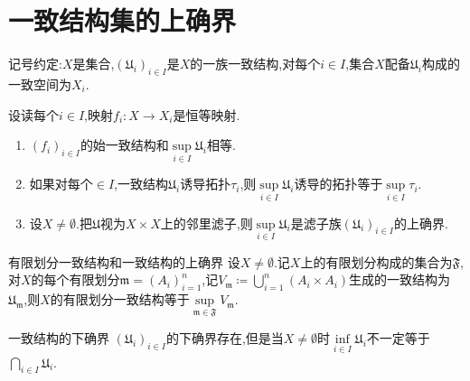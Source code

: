 \section{一致结构集的上确界}

记号约定:$X$是集合,$\left(\mathfrak{U}_{i}\right)_{i\in I}$是$X$的一族一致结构,对每个$i\in I$,集合$X$配备$\mathfrak{U}_{i}$构成的一致空间为$X_{i}$.

\begin{proposition}{}{}
	设读每个$i\in I$,映射$f_{i}:X\to X_{i}$是恒等映射.
	\begin{enumerate}
		\item $\left(f_{i}\right)_{i\in I}$的始一致结构和$\sup\limits_{i\in I}\mathfrak{U}_{i}$相等.
		\item 如果对每个$\in I$,一致结构$\mathfrak{U}_{i}$诱导拓扑$\tau_{i}$,则$\sup\limits_{i\in I}\mathfrak{U}_{i}$诱导的拓扑等于$\sup\limits_{i\in I}\tau_{i}$.
		\item 设$X\neq\emptyset$.把$\mathfrak{U}$视为$X\times X$上的邻里滤子,则$\sup\limits_{i\in I}\mathfrak{U}_{i}$是滤子族$\left(\mathfrak{U}_{i}\right)_{i\in I}$的上确界.
	\end{enumerate}
\end{proposition}

\begin{example}{有限划分一致结构和一致结构的上确界}{}
	设$X\neq\emptyset$.记$X$上的有限划分构成的集合为$\mathfrak{F}$,对$X$的每个有限划分$\mathfrak{m}=\left(A_{i}\right)_{i=1}^{n}$,记$V_{\mathfrak{m}}\coloneq\bigcup\limits_{i=1}^{n}\left(A_{i}\times A_{i}\right)$生成的一致结构为$\mathfrak{U}_{\mathfrak{m}}$,则$X$的有限划分一致结构等于$\sup\limits_{\mathfrak{m}\in\mathfrak{F}}V_{\mathfrak{m}}$.
\end{example}

\begin{remark}{一致结构的下确界}{}
	$\left(\mathfrak{U}_{i}\right)_{i\in I}$的下确界存在,但是当$X\neq\emptyset$时$\inf\limits_{i\in I}\mathfrak{U}_{i}$不一定等于$\bigcap\limits_{i\in I}\mathfrak{U}_{i}$.
\end{remark}



